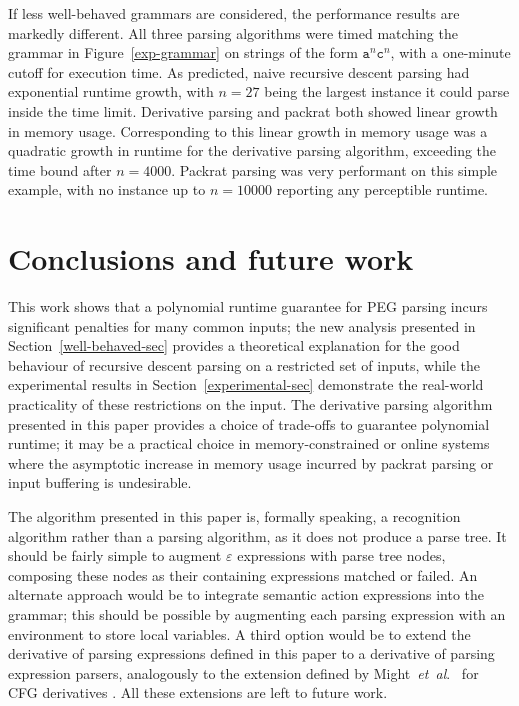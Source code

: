\documentclass[submission,copyright,creativecommons]{eptcs}
\newcommand{\chs}[1]{\mathtt{#1}}
\newcommand{\etal}{\textit{et~al}. }
\begin{document}
If less well-behaved grammars are considered, the performance results are markedly different. 
All three parsing algorithms were timed matching the grammar in Figure~\ref{exp-grammar} on strings of the form $\chs{a}^n\chs{c}^n$, with a one-minute cutoff for execution time. 
As predicted, naive recursive descent parsing had exponential runtime growth, with $n=27$ being the largest instance it could parse inside the time limit. 
Derivative parsing and packrat both showed linear growth in memory usage. 
Corresponding to this linear growth in memory usage was a quadratic growth in runtime for the derivative parsing algorithm, exceeding the time bound after $n=4000$. 
Packrat parsing was very performant on this simple example, with no instance up to $n=10000$ reporting any perceptible runtime.

\section{Conclusions and future work}
This work shows that a polynomial runtime guarantee for PEG parsing incurs significant penalties for many common inputs; the new analysis presented in Section~\ref{well-behaved-sec} provides a theoretical explanation for the good behaviour of recursive descent parsing on a restricted set of inputs, while the experimental results in Section~\ref{experimental-sec} demonstrate the real-world practicality of these restrictions on the input. 
The derivative parsing algorithm presented in this paper provides a choice of trade-offs to guarantee polynomial runtime; it may be a practical choice in memory-constrained or online systems where the asymptotic increase in memory usage incurred by packrat parsing or input buffering is undesirable.

The algorithm presented in this paper is, formally speaking, a recognition algorithm rather than a parsing algorithm, as it does not produce a parse tree. 
It should be fairly simple to augment $\varepsilon$ expressions with parse tree nodes, composing these nodes as their containing expressions matched or failed. 
An alternate approach would be to integrate semantic action expressions into the grammar; this should be possible by augmenting each parsing expression with an environment to store local variables. 
A third option would be to extend the derivative of parsing expressions defined in this paper to a derivative of parsing expression parsers, analogously to the extension defined by Might~\etal\ for CFG derivatives \cite{MDS11}. 
All these extensions are left to future work.
\end{document}
